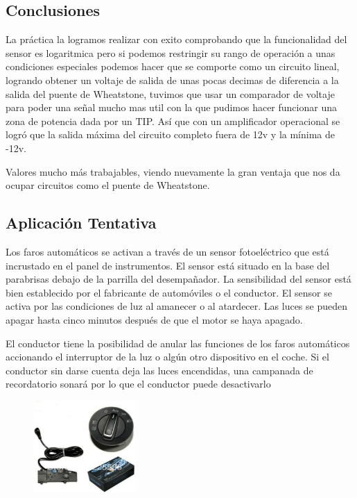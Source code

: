 \documentclass[12pt, fleqn]{article}                            %
\theoremstyle{break}                                            %
\begin{document}
    \subsection{Conclusiones} 

        La práctica la logramos realizar con exito comprobando que la funcionalidad del sensor es logaritmica
        pero si podemos restringir su rango de operación a unas condiciones especiales podemos hacer que
        se comporte como un circuito lineal, logrando obtener un voltaje de salida de unas pocas decimas de diferencia
        a la salida del puente de Wheatstone, tuvimos que usar un comparador de voltaje para poder una señal mucho mas util
        con la que pudimos hacer funcionar una zona de potencia dada por un TIP.
        Así que con un amplificador operacional se logró que la salida máxima del circuito completo
        fuera de 12v y la mínima de -12v.

        Valores mucho más trabajables, viendo nuevamente la gran ventaja que nos da ocupar circuitos como el puente
        de Wheatstone.


    \subsection{Aplicación Tentativa} 

        Los faros automáticos se activan a través de un sensor fotoeléctrico que
        está incrustado en el panel de instrumentos. El sensor está situado en la
        base del parabrisas debajo de la parrilla del desempañador. La
        sensibilidad del sensor está bien establecido por el fabricante de
        automóviles o el conductor. El sensor se activa por las condiciones de
        luz al amanecer o al atardecer. Las luces se pueden apagar hasta cinco
        minutos después de que el motor se haya apagado.

        El conductor tiene la posibilidad de anular
        las funciones de los faros automáticos
        accionando el interruptor de la luz o algún
        otro dispositivo en el coche. Si el conductor
        sin darse cuenta deja las luces encendidas,
        una campanada de recordatorio sonará
        por lo que el conductor puede desactivarlo

        \begin{figure}[h]
            \centering
            \includegraphics[width=0.35\textwidth]{Aplicaciones}
        \end{figure}
\end{document}
